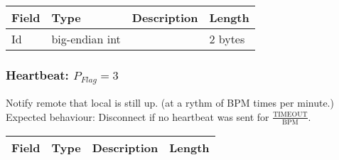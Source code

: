 \documentclass[a4paper,10pt]{article}
\begin{document}
                \noindent\begin{tabularx}{\textwidth}{|l|l|X|l|}
                    \hline Field & Type & Description & Length \\ \hline
                    \hline Id & big-endian int & & 2 bytes \\
                    \hline
                \end{tabularx}
            
            \subsubsection{Heartbeat: $P_{Flag} = 3$}
                Notify remote that local is still up. (at a rythm of BPM times per minute.)\\
                Expected behaviour: Disconnect if no heartbeat was sent for $\frac{\text{TIMEOUT}}{\text{BPM}}$.\\
                
                \noindent\begin{tabularx}{\textwidth}{|l|l|X|l|}
                    \hline Field & Type & Description & Length \\ \hline
                \end{tabularx}
            
\end{document}
